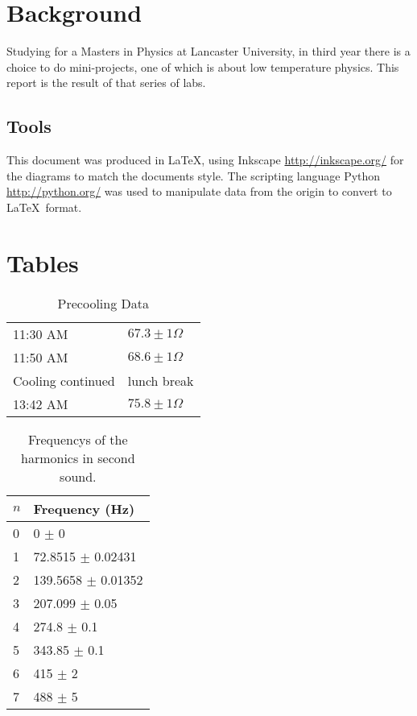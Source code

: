 \appendix
\section{Background}

Studying for a Masters in  Physics at Lancaster University, in third year there
is a choice to do mini-projects, one of which is about low temperature physics.
This report is the result of that series of labs.

\subsection{Tools}
This document was produced in \LaTeX, using Inkscape \url{http://inkscape.org/} for the diagrams
to match the documents style. The scripting language Python \url{http://python.org/} 
was used to manipulate data from the origin to convert to \LaTeX\ format.

\section{Tables}


\begin{table}[htbp]
\centering
\begin{tabular}{l l}
11:30 AM & $67.3 \pm 1 \Omega$ \\
11:50 AM & $68.6 \pm 1 \Omega$ \\
Cooling continued & lunch break \\
13:42 AM & $75.8 \pm 1 \Omega$
\end{tabular}
\caption{Precooling Data \label{tab:precool}}
\end{table}

\begin{table}[htbp]
\centering
\begin{tabular}{l|l}
$n$ & Frequency (Hz)\\ \hline
0& 0 $\pm$ 0 \\
1&72.8515 $\pm$ 0.02431 \\
2&139.5658 $\pm$ 0.01352 \\
3&207.099 $\pm$ 0.05 \\
4&274.8 $\pm$ 0.1 \\
5&343.85 $\pm$ 0.1 \\
6&415 $\pm$ 2 \\
7&488 $\pm$ 5 \\
\end{tabular}
\caption{Frequencys of the harmonics in second sound. \label{tab:harmonics}}
\end{table}

